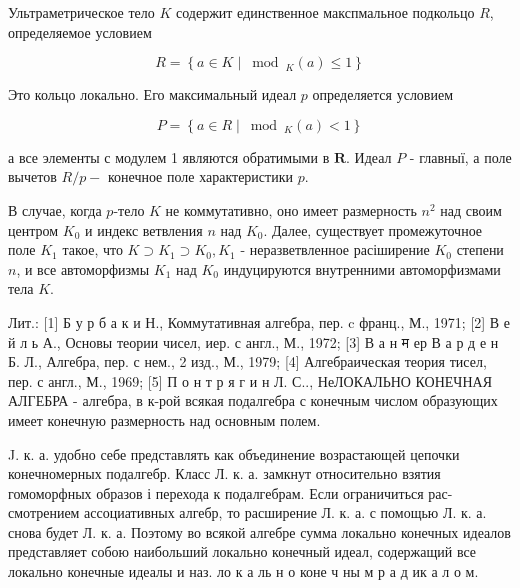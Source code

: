 \documentclass[10pt]{article}
\begin{document}
Ультраметрическое тело $K$ содержит единственное макспмальное подкольцо $R$, определяемое условием



\[

R=\left\{a \in K \mid \bmod _{K}(a) \leqslant 1\right\}

\]



Это кольцо локально. Его максимальный идеал $p$ определяется условием



\[

P=\left\{a \in R \mid \bmod _{K}(a)<1\right\}

\]



а все элементы с модулем 1 являются обратимыми в $\boldsymbol{R}$. Идеал $P$ - главныї, а поле вычетов $R / p-$ конечное поле характеристики $p$.



В случае, когда $p$-тело $K$ не коммутативно, оно имеет размерность $n^{2}$ над своим центром $K_{0}$ и индекс ветвления $n$ над $K_{0}$. Далее, существует промежуточное поле $K_{1}$ такое, что $K \supset K_{1} \supset K_{0}, K_{1}$ - неразветвленное расіширение $K_{0}$ степени $n$, и все автоморфизмы $K_{1}$ над $K_{0}$ индуцируются внутренними автоморфизмами тела $K$.



Лит.: [1] Б у р б а к и Н., Коммутативная алгебра, пер. c франц., М., 1971; [2] В е й л ь А., Основы теории чисел, иер. с англ., М., 1972; [3] В а н म ер В а р д е н Б. Л., Алгебра, пер. с нем., 2 изд., М., 1979; [4] Алгебраическая теория тисел, пер. с англ., М., 1969; [5] П о н т р я г и н Л. С.., НеЛОКАЛЬНО КОНЕЧНАЯ АЛГЕБРА - алгебра, в к-рой всякая подалгебра с конечным числом образующих имеет конечную размерность над основным полем.



J. к. а. удобно себе представлять как объединение возрастающей цепочки конечномерных подалгебр. Класс Л. к. а. замкнут относительно взятия гомоморфных образов і перехода к подалгебрам. Если ограничиться рас- смотрением ассоциативных алгебр, то расширение Л. к. а. с помощью Л. к. а. снова будет Л. к. а. Поэтому во всякой алгебре сумма локально конечных идеалов представляет собою наибольший локально конечный идеал, содержащий все локально конечные идеалы и наз. ло к а ль н о коне ч ны м р а д ик а л о м.
\end{document}
